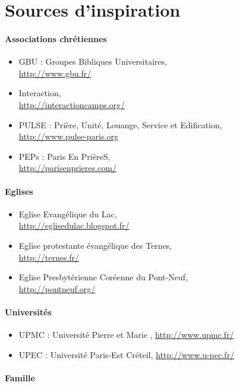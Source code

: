 \section{Sources d'inspiration}

	\paragraph{Associations chrétiennes}
	
	\begin{itemize}
	\item GBU : Groupes Bibliques Universitaires,\\
		\url{http://www.gbu.fr/}
	\item Interaction,\\
		\url{http://interactioncamps.org/}
	\item PULSE : Prière, Unité, Louange, Service et Edification,\\
		\url{http://www.pulse-paris.org}
	\item PEPs : Paris En PrièreS,\\
		\url{http://parisenprieres.com/}
	\end{itemize}
	
	\paragraph{Eglises}
	
	\begin{itemize}
	\item Eglise Evangélique du Lac,\\
		\url{http://eglisedulac.blogspot.fr/}
	\item Eglise protestante évangélique des Ternes,\\
		\url{http://ternes.fr/} %
	\item Eglise Presbytérienne Coréenne du Pont-Neuf,\\
		\url{http://pontneuf.org/}
	\end{itemize}
	
	\paragraph{Universités}
	
	\begin{itemize}
	\item UPMC : Université Pierre et Marie ,
        \url{http://www.upmc.fr/}
	\item UPEC : Université Paris-Est Créteil,
        \url{http://www.u-pec.fr/}
	\end{itemize}
	
	\paragraph{Famille}
	
